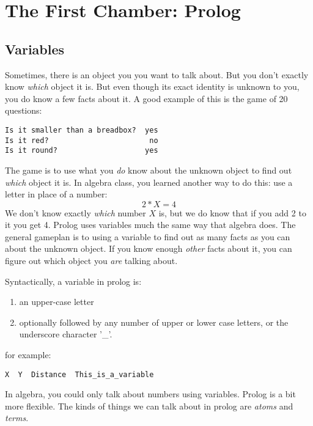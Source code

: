 \documentclass{book}[9pt]
\begin{document}
\chapter{The First Chamber: Prolog}

\section{Variables}

Sometimes, there is an object you you want to talk about.  But you don't exactly
know {\em which} object it is.   But even though its exact identity is unknown to you,
you do know a few facts about it.  A good example of this is the game of 20
questions:
\begin{verbatim}
Is it smaller than a breadbox?  yes
Is it red?                       no
Is it round?                    yes
\end{verbatim}
\noindent The game is to use what you {\em do} know about the unknown
object to find out {\em which} object it is.  In algebra class, you
learned another way to do this: use a letter in place of a number:
\begin{displaymath}
2*X=4
\end{displaymath}
\noindent We don't know exactly {\em which} number $X$ is, but we do
know that if you add 2 to it you get 4.  Prolog uses variables much
the same way that algebra does.  The general gameplan is to using a
variable to find out as many facts as you can about the unknown object.
If you know enough {\em other} facts about it, you can figure out which
object you {\em are} talking about.

Syntactically, a variable in prolog is:
\begin{enumerate}
\item an  upper-case letter
\item optionally followed by any number of upper or lower case letters,
or the underscore character '\_'. 
\end{enumerate}
\noindent for example:
\begin{verbatim}
X  Y  Distance  This_is_a_variable
\end{verbatim}

In algebra, you could only talk about numbers using variables.  Prolog
is a bit more flexible.  The kinds of things we can talk about in
prolog are {\em atoms} and {\em terms}.
\end{document}
